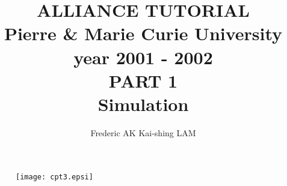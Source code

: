 \documentclass[12pt]{article}
\begin{document}
\title{
                    {\Huge ALLIANCE TUTORIAL\\}
	 {\large
               Pierre \& Marie Curie University \\
                    year 2001 - 2002\\
    }
    \vspace{1cm}
    {\huge
                      PART 1\\
                Simulation
    }
}
\date{}
      
\author{Frederic AK \hspace{2cm}  Kai-shing LAM
}

\maketitle

\begin{figure}[H]\centering
  \texttt{[image: cpt3.epsi]}
\end{figure}

\begin{figure}
\end{figure}

\thispagestyle{empty}
\def\myfbox#1{\vspace*{3mm}\fbox{#1}\vspace{3mm}}

        \vspace{3cm}
\end{document}
